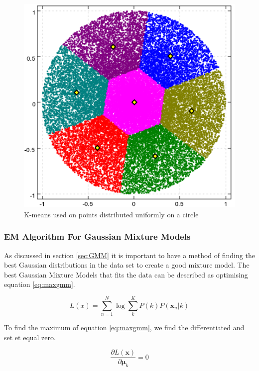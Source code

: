 \begin{figure}[H]
\centering
\includegraphics[scale=0.5]{billeder/CircleClusters}
\caption{K-means used on points distributed uniformly on a circle}
\label{fig:badkmeans}
\end{figure}

\subsubsection{EM Algorithm For Gaussian Mixture Models}
\label{sec:EMAlgorithm}

As discussed in section \ref{sec:GMM} it is important to have a method of finding the best Gaussian distributions in the data set to create a good mixture model. The best Gaussian Mixture Models that fits the data can be described as optimising equation \ref{eq:maxgmm}.

\begin{equation}
 L(x) = \sum\limits_{n=1}^N{\log{\sum\limits_{k}^K P(k) P(\textbf{x}_n|k) }}
\label{eq:maxgmm}
\end{equation}

To find the maximum of equation \ref{eq:maxgmm}, we find the differentiated and set et equal zero. 

 \begin{equation}
 \frac{\partial L(\textbf{x})}{\partial{\mathbold{\mu}_k}} = 0
\label{eq:partialzero}
\end{equation}


